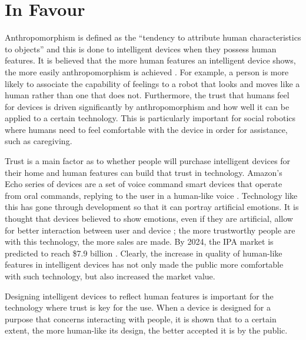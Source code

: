 \documentclass{article}
\begin{document}
\section{In Favour}
Anthropomorphism is defined as the “tendency to attribute human characteristics to objects” \cite{woods2004anthropomorphism} and this is done to intelligent devices when they possess human features. It is believed that the more human features an intelligent device shows, the more easily anthropomorphism is achieved \cite{vanPinxteren2019features}. For example, a person is more likely to associate the capability of feelings to a robot that looks and moves like a human rather than one that does not. Furthermore, the trust that humans feel for devices is driven significantly by anthropomorphism \cite{woods2004anthropomorphism} and how well it can be applied to a certain technology. This is particularly important for social robotics where humans need to feel comfortable with the device in order for assistance, such as caregiving.\par
Trust is a main factor as to whether people will purchase intelligent devices for their home and human features can build that trust in technology. Amazon’s Echo series of devices are a set of voice command smart devices that operate from oral commands, replying to the user in a human-like voice \cite{amazon2022echo}. Technology like this has gone through development so that it can portray artificial emotions. It is thought that devices believed to show emotions, even if they are artificial, allow for better interaction between user and device \cite{buiu2011emotions}; the more trustworthy people are with this technology, the more sales are made. By 2024, the IPA market is predicted to reach \$7.9 billion \cite{tmr2016market}. Clearly, the increase in quality of human-like features in intelligent devices has not only made the public more comfortable with such technology, but also increased the market value.\par
Designing intelligent devices to reflect human features is important for the technology where trust is key for the use. When a device is designed for a purpose that concerns interacting with people, it is shown that to a certain extent, the more human-like its design, the better accepted it is by the public.
\end{document}
